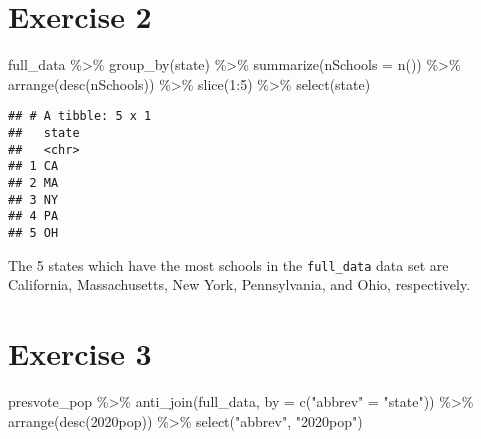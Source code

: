 \documentclass[
]{article}
\newenvironment{Shaded}{\begin{snugshade}}{\end{snugshade}}
\newcommand{\AttributeTok}[1]{\textcolor[rgb]{0.77,0.63,0.00}{#1}}
\newcommand{\DecValTok}[1]{\textcolor[rgb]{0.00,0.00,0.81}{#1}}
\newcommand{\FunctionTok}[1]{\textcolor[rgb]{0.00,0.00,0.00}{#1}}
\newcommand{\NormalTok}[1]{#1}
\newcommand{\OtherTok}[1]{\textcolor[rgb]{0.56,0.35,0.01}{#1}}
\newcommand{\SpecialCharTok}[1]{\textcolor[rgb]{0.00,0.00,0.00}{#1}}
\newcommand{\StringTok}[1]{\textcolor[rgb]{0.31,0.60,0.02}{#1}}
\begin{document}
\hypertarget{exercise-2}{%
\section{Exercise 2}\label{exercise-2}}

\begin{Shaded}
\begin{Highlighting}[]
\NormalTok{full\_data }\SpecialCharTok{\%\textgreater{}\%}
  \FunctionTok{group\_by}\NormalTok{(state) }\SpecialCharTok{\%\textgreater{}\%}
  \FunctionTok{summarize}\NormalTok{(}\AttributeTok{nSchools =} \FunctionTok{n}\NormalTok{()) }\SpecialCharTok{\%\textgreater{}\%}
  \FunctionTok{arrange}\NormalTok{(}\FunctionTok{desc}\NormalTok{(nSchools)) }\SpecialCharTok{\%\textgreater{}\%}
  \FunctionTok{slice}\NormalTok{(}\DecValTok{1}\SpecialCharTok{:}\DecValTok{5}\NormalTok{) }\SpecialCharTok{\%\textgreater{}\%}
  \FunctionTok{select}\NormalTok{(state)}
\end{Highlighting}
\end{Shaded}

\begin{verbatim}
## # A tibble: 5 x 1
##   state
##   <chr>
## 1 CA   
## 2 MA   
## 3 NY   
## 4 PA   
## 5 OH
\end{verbatim}

The 5 states which have the most schools in the \texttt{full\_data} data
set are California, Massachusetts, New York, Pennsylvania, and Ohio,
respectively.

\hypertarget{exercise-3}{%
\section{Exercise 3}\label{exercise-3}}

\begin{Shaded}
\begin{Highlighting}[]
\NormalTok{presvote\_pop }\SpecialCharTok{\%\textgreater{}\%}
  \FunctionTok{anti\_join}\NormalTok{(full\_data, }\AttributeTok{by =} \FunctionTok{c}\NormalTok{(}\StringTok{"abbrev"} \OtherTok{=} \StringTok{"state"}\NormalTok{)) }\SpecialCharTok{\%\textgreater{}\%}
  \FunctionTok{arrange}\NormalTok{(}\FunctionTok{desc}\NormalTok{(}\StringTok{\textasciigrave{}}\AttributeTok{2020pop}\StringTok{\textasciigrave{}}\NormalTok{)) }\SpecialCharTok{\%\textgreater{}\%}
  \FunctionTok{select}\NormalTok{(}\StringTok{"abbrev"}\NormalTok{, }\StringTok{"2020pop"}\NormalTok{)}
\end{Highlighting}
\end{Shaded}
\end{document}

